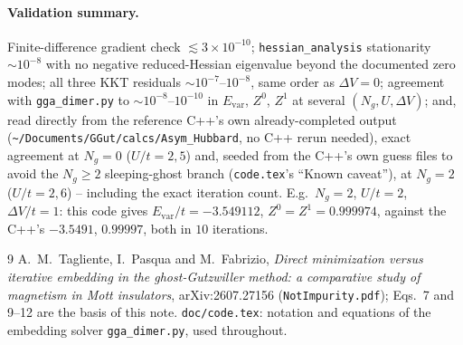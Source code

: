 \documentclass[11pt]{article}
\newcommand{\Ng}{N_{g}}
\begin{document}
\paragraph{Validation summary.} Finite-difference gradient check
$\lesssim3\times10^{-10}$; \texttt{hessian\_analysis} stationarity $\sim10^{-8}$ with no
negative reduced-Hessian eigenvalue beyond the documented zero modes; all three KKT
residuals $\sim10^{-7}$--$10^{-8}$, same order as $\Delta V=0$; agreement with
\texttt{gga\_dimer.py} to $\sim10^{-8}$--$10^{-10}$ in $E_{\mathrm{var}}$, $Z^0$, $Z^1$ at
several $(\Ng,U,\Delta V)$; and, read directly from the reference C++'s own
already-completed output (\texttt{\textasciitilde/Documents/GGut/calcs/Asym\_Hubbard},
no C++ rerun needed), exact agreement at $\Ng=0$ ($U/t=2,5$) and, seeded from the C++'s
own guess files to avoid the $\Ng\ge2$ sleeping-ghost branch (\texttt{code.tex}'s ``Known
caveat''), at $\Ng=2$ ($U/t=2,6$) -- including the exact iteration count. E.g.\ $\Ng=2$,
$U/t=2$, $\Delta V/t=1$: this code gives $E_{\mathrm{var}}/t=-3.549112$, $Z^0=Z^1=0.999974$,
against the C++'s $-3.5491$, $0.99997$, both in $10$ iterations.

\begin{thebibliography}{9}
 A.~M.~Tagliente, I.~Pasqua and M.~Fabrizio, \emph{Direct minimization versus
  iterative embedding in the ghost-Gutzwiller method: a comparative study of magnetism in
  Mott insulators}, arXiv:2607.27156 (\texttt{NotImpurity.pdf}); Eqs.~7 and 9--12 are the
  basis of this note.
 \texttt{doc/code.tex}: notation and equations of the embedding solver
  \texttt{gga\_dimer.py}, used throughout.
\end{thebibliography}
\end{document}
